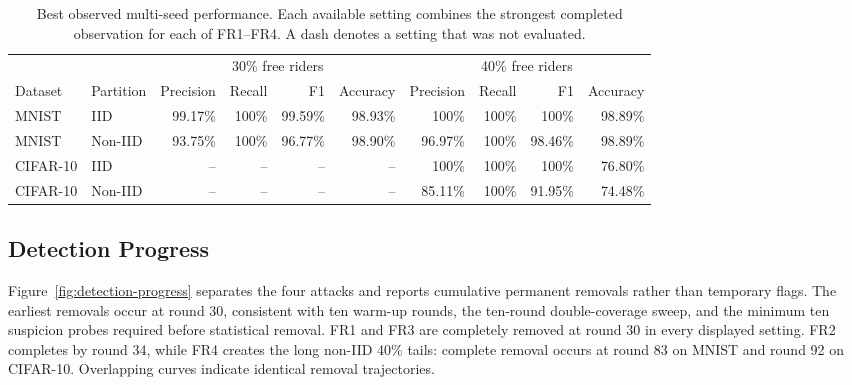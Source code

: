 \documentclass[conference]{IEEEtran}
\begin{document}
\begin{table}[t]
\centering
\caption{Best observed multi-seed performance. Each available setting combines the strongest completed observation for each of FR1--FR4. A dash denotes a setting that was not evaluated.}
\label{tab:aggregate}
\setlength{\tabcolsep}{3.5pt}
\begin{tabular}{llrrrrrrrr}
\toprule
& & \multicolumn{4}{c}{30\% free riders} & \multicolumn{4}{c}{40\% free riders} \\
\cmidrule(lr){3-6}\cmidrule(lr){7-10}
Dataset & Partition & Precision & Recall & F1 & Accuracy & Precision & Recall & F1 & Accuracy \\
\midrule
MNIST & IID     & 99.17\% & 100\% & 99.59\% & 98.93\% & 100\%   & 100\% & 100\%   & 98.89\% \\
MNIST & Non-IID & 93.75\% & 100\% & 96.77\% & 98.90\% & 96.97\% & 100\% & 98.46\% & 98.89\% \\
CIFAR-10 & IID     & -- & -- & -- & -- & 100\%   & 100\% & 100\%   & 76.80\% \\
CIFAR-10 & Non-IID & -- & -- & -- & -- & 85.11\% & 100\% & 91.95\% & 74.48\% \\
\bottomrule
\end{tabular}
\end{table}

\subsection{Detection Progress}
Figure~\ref{fig:detection-progress} separates the four attacks and reports cumulative permanent removals rather than temporary flags. The earliest removals occur at round 30, consistent with ten warm-up rounds, the ten-round double-coverage sweep, and the minimum ten suspicion probes required before statistical removal. FR1 and FR3 are completely removed at round 30 in every displayed setting. FR2 completes by round 34, while FR4 creates the long non-IID 40\% tails: complete removal occurs at round 83 on MNIST and round 92 on CIFAR-10. Overlapping curves indicate identical removal trajectories.
\end{document}
